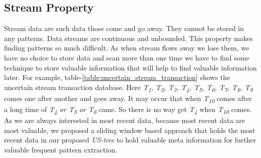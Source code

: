     \subsection{Stream Property}
    Stream data are such data those come and go away. They cannot be stored in any patterns. Data streams are continuous and unbounded. This property makes finding patterns so much difficult. As when stream flows away we lose them, we have no choice to store data and scan more than one time we have to find some technique to store valuable information that will help to find valuable information later. For example, table-\ref{table:uncertain_stream_transaction} shows the uncertain stream transaction database. Here \emph{T\textsubscript{1}, T\textsubscript{2}, T\textsubscript{3}, T\textsubscript{4}, T\textsubscript{5}, T\textsubscript{6}, T\textsubscript{7}, T\textsubscript{8}, T\textsubscript{9}} comes one after another and goes away. It may occur that when \emph{T\textsubscript{10}} comes after a long time of \emph{T\textsubscript{4} or T\textsubscript{5} or T\textsubscript{6}} came. So there is no way get \emph{T\textsubscript{4}} when \emph{T\textsubscript{10}} comes. As we are always interested in most recent data, because most recent data are most valuable, we proposed a sliding window based approach that holds the most recent data in our proposed \emph{US-tree} to hold valuable meta information for further valuable frequent pattern extraction.

